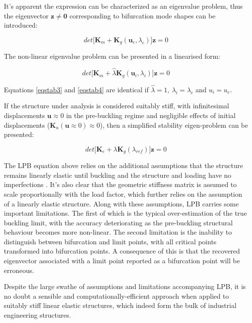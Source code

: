 It's apparent the expression can be characterized as an eigenvalue problem, thus the eigenvector $\mathbf{z} \neq \mathbf{0}$ corresponding to bifurcation mode shapes can be introduced:

\begin{equation} 
det\big[
\mathbf{K}_m +
\mathbf{K}_g(\mathbf{u}_c,\lambda_c)
\big]\mathbf{z} = 0
\label{eqstab3}
\end{equation}

The non-linear eigenvalue problem can be presented in a linearised form:

\begin{equation} 
det\big[
\mathbf{K}_m +
\hat{\lambda}
\mathbf{K}_g(\mathbf{u}_i,\lambda_i)
\big]\mathbf{z} = 0
\label{eqstab4}
\end{equation}

Equations \ref{eqstab3} and \ref{eqstab4} are identical if $\hat{\lambda}
 = 1,\ \lambda_i = \lambda_c$ and $u_i = u_c$.
 
 If the structure under analysis is considered suitably stiff, with infinitesimal displacements $\mathbf{u} \approx 0$ in the pre-buckling regime and negligible effects of initial displacements ($\mathbf{K}_u(\mathbf{u} \approx 0) \approx 0$), then a simplified stability eigen-problem can be presented:
 
 \begin{equation} 
 det\big[
 \mathbf{K}_e +
{\lambda}
 \mathbf{K}_g(\lambda_{ref})
 \big]\mathbf{z} = 0
 \label{eqstab5}
 \end{equation}
 
 The LPB equation above relies on the additional assumptions that the structure remains linearly elastic until buckling and the structure and loading have no imperfections \cite{FelippaStabilityBasics2016}. It's also clear that the geometric stiffness matrix is assumed to scale proportionally with the load factor, which further relies on the assumption of a linearly elastic structure. Along with these assumptions, LPB carries some important limitations. The first of which is the typical over-estimation of the true buckling limit, with the accuracy deteriorating as the pre-buckling structural behaviour becomes more non-linear. The second limitation is the inability to distinguish between bifurcation and limit points, with all critical points transformed into bifurcation points. A consequence of this is that the recovered eigenvector associated with a limit point reported as a bifurcation point will be erroneous.
 
 Despite the large swathe of assumptions and limitations accompanying LPB, it is no doubt a sensible and computationally-efficient approach when applied to suitably stiff linear elastic structures, which indeed form the bulk of industrial engineering structures.

